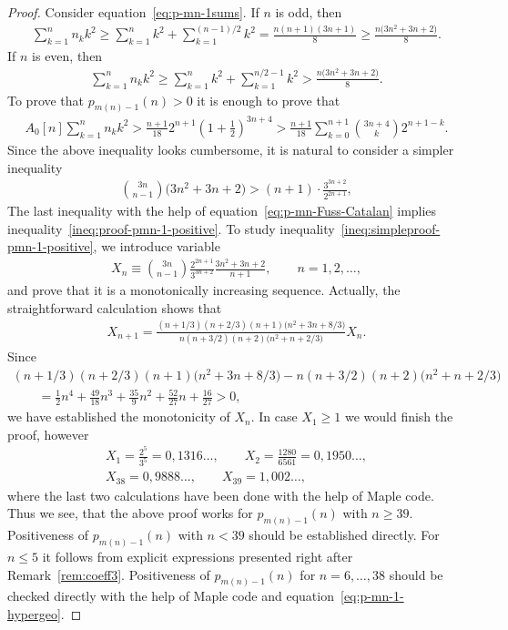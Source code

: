 \documentclass[pdftex]{sigma}
\numberwithin{equation}{section}
\begin{document}
\begin{proof}Consider equation~\eqref{eq:p-mn-1sums}. If $n$ is odd, then
\begin{gather*}
\sum\limits_{k=1}^nn_kk^2\geq\sum\limits_{k=1}^nk^2+\sum\limits_{k=1}^{(n-1)/2}k^2=
\frac{n(n+1)(3n+1)}8\geq\frac{n\big(3n^2+3n+2\big)}8.
\end{gather*}
If $n$ is even, then
\begin{gather*}
\sum\limits_{k=1}^nn_kk^2\geq\sum\limits_{k=1}^{n}k^2+\sum\limits_{k=1}^{n/2-1}k^2>\frac{n\big(3n^2+3n+2\big)}8.
\end{gather*}
To prove that $p_{m(n)-1}(n)>0$ it is enough to prove that
\begin{gather}\label{ineq:proof-pmn-1-positive}
A_0[n]\sum\limits_{k=1}^{n}n_kk^2>\frac{n+1}{18}2^{n+1}\left(1+\frac12\right)^{3n+4}>
\frac{n+1}{18}\sum\limits_{k=0}^{n+1}\binom{3n+4}{k}2^{n+1-k}.
\end{gather}
Since the above inequality looks cumbersome, it is natural to consider a simpler inequality
\begin{gather}\label{ineq:simpleproof-pmn-1-positive}
\binom{3n}{n-1}\big(3n^2+3n+2\big)>(n+1)\cdot\frac{3^{3n+2}}{2^{2n+1}},
\end{gather}
The last inequality with the help of equation~\eqref{eq:p-mn-Fuss-Catalan} implies
inequality~\eqref{ineq:proof-pmn-1-positive}. To study inequa\-li\-ty~\eqref{ineq:simpleproof-pmn-1-positive}, we
introduce variable
\begin{gather*}
X_n\equiv\binom{3n}{n-1} \frac{2^{2n+1}}{3^{3n+2}} \frac{3n^2+3n+2}{n+1},\qquad n=1,2,\ldots,
\end{gather*}
and prove that it is a monotonically increasing sequence. Actually, the straightforward calculation shows
that
\begin{gather*}
X_{n+1}=\frac{(n+1/3)(n+2/3)(n+1)\big(n^2+3n+8/3\big)}{n(n+3/2)(n+2)\big(n^2+n+2/3\big)}X_n.
\end{gather*}
Since
\begin{gather*}
(n+1/3)(n+2/3)(n+1)\big(n^2+3n+8/3\big)-n(n+3/2)(n+2)\big(n^2+n+2/3\big)\\
\qquad{}=\frac12n^4+\frac{49}{18}n^3+\frac{35}{9}n^2+\frac{52}{27}n+\frac{16}{27}>0,
\end{gather*}
we have established the monotonicity of $X_n$. In case $X_1\geq1$ we would finish the proof, however
\begin{gather*}
X_1=\frac{2^5}{3^5}=0,1316\ldots,\qquad
X_2=\frac{1280}{6561}=0,1950\ldots,\\
X_{38}=0,9888\ldots,\qquad X_{39}=1,002\ldots,
\end{gather*}
where the last two calculations have been done with the help of Maple code. Thus we see, that the above proof
works for $p_{m(n)-1}(n)$ with $n\geq39$. Positiveness of $p_{m(n)-1}(n)$ with $n<39$ should be established
directly. For $n\leq5$ it follows from explicit expressions presented right after Remark~\ref{rem:coeff3}.
Positiveness of $p_{m(n)-1}(n)$ for $n=6,\ldots,38$ should be checked directly with the help of Maple code and
equation~\eqref{eq:p-mn-1-hypergeo}.
\end{proof}
\end{document}
